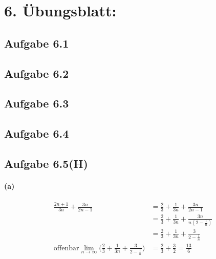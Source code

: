 \section{6. Übungsblatt:}

\subsection{Aufgabe 6.1}

\subsection{Aufgabe 6.2}

\subsection{Aufgabe 6.3}

\subsection{Aufgabe 6.4}

\newpage

\subsection{Aufgabe 6.5(H)}

\paragraph{(a)}
\begin{align*}
\frac{2n+1}{3n}+\frac{3n}{2n-1}
&=\frac{2}{3}+\frac{1}{3n}+\frac{3n}{2n-1}\\
&=\frac{2}{3}+\frac{1}{3n}+\frac{3n}{n(2-\frac{1}{n})}\\
&=\frac{2}{3}+\frac{1}{3n}+\frac{3}{2-\frac{1}{n}}\\
\mbox{offenbar}\lim_{n\rightarrow\infty}\Bigg(\frac{2}{3}+\frac{1}{3n}+\frac{3}{2-\frac{1}{n}}\Bigg)&=\frac{2}{3}+\frac{3}{2}=\frac{13}{6}
\end{align*}

